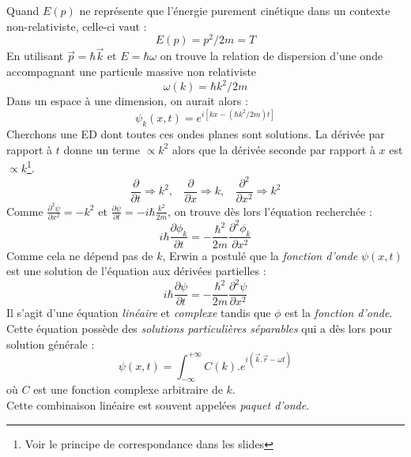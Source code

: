 \documentclass[british,french,11pt, a4paper, openany]{book}
\begin{document}
	Quand $E(p)$ ne représente que l'énergie purement cinétique dans un contexte non-relativiste, celle-ci vaut :
	\begin{equation}
		E(p) = p^2/2m=T
	\end{equation}
	En utilisant $\vec{p} = \hbar \vec{k}$ et $E = \hbar\omega$ on trouve la relation de dispersion d'une onde accompagnant une particule massive non relativiste
	\begin{equation}
		\omega (k) = \hbar k^2/2m
	\end{equation}
	Dans un espace à une dimension, on aurait alors : 
	\begin{equation}
		\psi_k(x,t) = e^{i[kx -(\hbar k^2/2m)t]}
	\end{equation}
	Cherchons une ED dont toutes ces ondes planes sont solutions. La dérivée par rapport à $t$ donne un terme $\propto k^2$ alors que la dérivée seconde par rapport à $x$ est $\propto k$\footnote{Voir le principe de correspondance dans les slides}.
	\begin{equation}
		\frac{\partial}{\partial t} \Rightarrow k^2,\ \ \ \ \frac{\partial}{\partial x} \Rightarrow k,\ \ \ \ \frac{\partial^2}{\partial x^2} \Rightarrow k^2
	\end{equation}
	Comme $\frac{\partial^2 \psi}{\partial x^2}=-k^2$ et $\frac{\partial\psi}{\partial t}=-i\hbar\frac{k^2}{2m}$, on trouve dès lors l'équation recherchée :
	\begin{equation}
		i\hbar \frac{\partial \phi_k}{\partial t} = -\frac{\hbar^2}{2m}\frac{\partial^2 \phi_k}{\partial x^2}
	\end{equation}
	Comme cela ne dépend pas de $k$, Erwin a postulé que la \textit{fonction d'onde} $\psi (x,t)$ est une solution de l'équation aux dérivées partielles : 
	\begin{equation}
		i\hbar \frac{\partial \psi}{\partial t} = -\frac{\hbar^2}{2m}\frac{\partial^2 \psi}{\partial x^2}
	\end{equation}
	Il s'agit d'une équation \textit{linéaire} et \textit{complexe} tandis que $\phi$ est la \textit{fonction d'onde}.\\
	
	
	Cette équation possède des \textit{solutions particulières séparables} qui a dès lors pour solution générale :
	\begin{equation}
		\psi (x,t) = \int_{-\infty}^{+\infty} C(k).e^{i(\vec{k}.\vec{r} - \omega t)}
	\end{equation}
	où $C$ est une fonction complexe arbitraire de $k$.\\
	Cette combinaison linéaire est souvent appelées \textit{paquet d'onde}.\\
	
\end{document}
